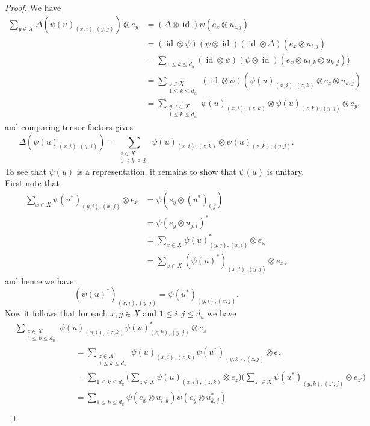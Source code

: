\documentclass[12pt, a4paper]{amsart}
\def\id{\operatorname{id}}
\theoremstyle{definition}
\theoremstyle{remark}
\numberwithin{equation}{section}
\begin{document}
\begin{proof}
	We have
	\begin{align*}
		\sum_{y\in X} \Delta(\psi(u)_{(x,i),(y,j)}) \otimes e_y &= (\Delta\otimes\id)\psi(e_x\otimes u_{i,j}) \\
		&= (\id\otimes\psi)(\psi\otimes\id)(\id\otimes\Delta)(e_x\otimes u_{i,j}) \\
		&= \sum_{1\le k\le d_u}(\id\otimes\psi)(\psi\otimes\id)(e_x\otimes u_{i,k}\otimes u_{k,j})) \\
		&= \sum_{\substack{z\in X\\ 1\le k\le d_u}} (\id\otimes\psi)(\psi(u)_{(x,i),(z,k)}\otimes e_z \otimes u_{k,j}) \\
		&= \sum_{\substack{y,z\in X\\ 1\le k\le d_u}}\psi(u)_{(x,i),(z,k)} \otimes \psi(u)_{(z,k),(y,j)} \otimes e_y,
	\end{align*}
	and comparing tensor factors gives 
	\[
	\Delta(\psi(u)_{(x,i),(y,j)}) = \sum_{\substack{z\in X\\ 1\le k\le d_u}} \psi(u)_{(x,i),(z,k)} \otimes \psi(u)_{(z,k),(y,j)}.
	\]
	To see that $\psi(u)$ is a representation, it remains to show that $\psi(u)$ is unitary. First note that 
	\begin{align*}
		\sum_{x\in X}\psi(u^*)_{(y,i),(x,j)}\otimes e_x &= \psi(e_y\otimes (u^*)_{i,j})\\
		&=\psi(e_y\otimes u_{j,i})^*\\
		&=\sum_{x\in X}\psi(u)_{(y,j),(x,i)}^*\otimes e_x\\
		&=\sum_{x\in X}(\psi(u)^*)_{(x,i),(y,j)}\otimes e_x,
	\end{align*}
	and hence we have 
	\[
	(\psi(u)^*)_{(x,i),(y,j)}=\psi(u^*)_{(y,i),(x,j)}.
	\]
	Now it follows that for each $x,y\in X$ and $1\le i,j\le d_u$ we have
	\begin{align*}
		&\sum_{\substack{z\in X\\ 1\le k\le d_u}}\psi(u)_{(x,i),(z,k)}\psi(u)_{(z,k),(y,j)}^*\otimes e_z\\
		&\hspace{3cm}= \sum_{\substack{z\in X\\ 1\le k\le d_u}}\psi(u)_{(x,i),(z,k)}\psi(u^*)_{(y,k),(z,j)}\otimes e_z\\
		&\hspace{3cm}= \sum_{1\le k\le d_u}\Big(\sum_{z\in X}\psi(u)_{(x,i),(z,k)}\otimes e_z\Big)\Big(\sum_{z'\in X}\psi(u^*)_{(y,k),(z',j)}\otimes e_{z'}\Big)\\
		&\hspace{3cm}=\sum_{1\le k\le d_u}\psi(e_x\otimes u_{i,k})\psi(e_y\otimes u_{k,j}^*)\\

\end{align*}
\end{proof}
\end{document}

